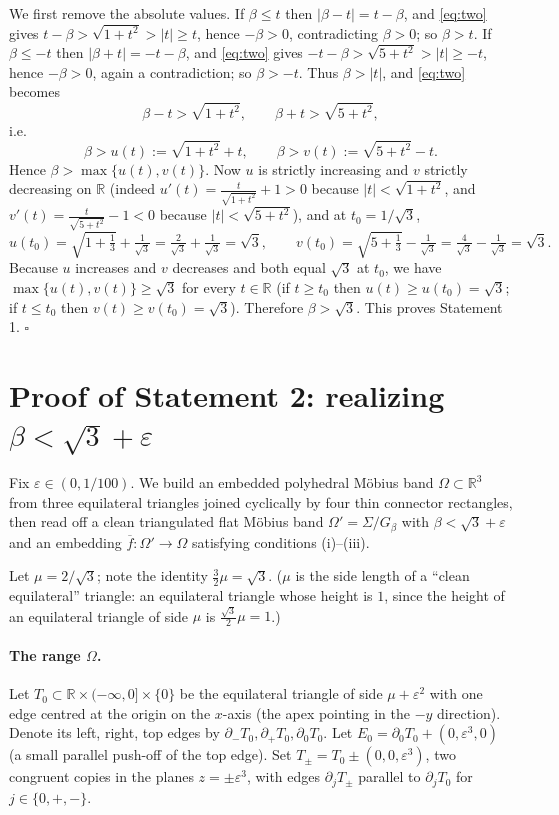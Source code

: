 \documentclass[12pt]{article}
\newcommand{\R}{\mathbb{R}}
\newcommand{\eps}{\varepsilon}
\newcommand{\Sig}{\Sigma}
\begin{document}
We first remove the absolute values. If $\beta\le t$ then
$|\beta-t|=t-\beta$, and \eqref{eq:two} gives
$t-\beta>\sqrt{1+t^2}>|t|\ge t$, hence $-\beta>0$, contradicting
$\beta>0$; so $\beta>t$. If $\beta\le -t$ then $|\beta+t|=-t-\beta$, and
\eqref{eq:two} gives $-t-\beta>\sqrt{5+t^2}>|t|\ge -t$, hence
$-\beta>0$, again a contradiction; so $\beta>-t$. Thus $\beta>|t|$, and
\eqref{eq:two} becomes
\[
\beta-t>\sqrt{1+t^2},\qquad \beta+t>\sqrt{5+t^2},
\]
i.e.
\[
\beta>u(t):=\sqrt{1+t^2}+t,\qquad \beta>v(t):=\sqrt{5+t^2}-t .
\]
Hence $\beta>\max\{u(t),v(t)\}$. Now $u$ is strictly increasing and $v$
strictly decreasing on $\R$ (indeed $u'(t)=\tfrac{t}{\sqrt{1+t^2}}+1>0$
because $|t|<\sqrt{1+t^2}$, and $v'(t)=\tfrac{t}{\sqrt{5+t^2}}-1<0$
because $|t|<\sqrt{5+t^2}$), and at $t_0=1/\sqrt3$,
\[
u(t_0)=\sqrt{1+\tfrac13}+\tfrac1{\sqrt3}=\tfrac{2}{\sqrt3}+\tfrac1{\sqrt3}
=\sqrt3,\qquad
v(t_0)=\sqrt{5+\tfrac13}-\tfrac1{\sqrt3}=\tfrac{4}{\sqrt3}-\tfrac1{\sqrt3}
=\sqrt3 .
\]
Because $u$ increases and $v$ decreases and both equal $\sqrt3$ at $t_0$,
we have $\max\{u(t),v(t)\}\ge\sqrt3$ for every $t\in\R$ (if $t\ge t_0$
then $u(t)\ge u(t_0)=\sqrt3$; if $t\le t_0$ then $v(t)\ge v(t_0)=\sqrt3$).
Therefore $\beta>\sqrt3$. This proves Statement 1. \hfill$\square$

\section{Proof of Statement 2: realizing $\beta<\sqrt3+\eps$}
\label{sec:S2}

Fix $\eps\in(0,1/100)$. We build an embedded polyhedral M\"obius band
$\Omega\subset\R^3$ from three equilateral triangles joined cyclically by
four thin connector rectangles, then read off a clean triangulated flat
M\"obius band $\Omega'=\Sig/G_\beta$ with $\beta<\sqrt3+\eps$ and an
embedding $\overline f:\Omega'\to\Omega$ satisfying conditions (i)--(iii).

Let $\mu=2/\sqrt3$; note the identity $\tfrac32\mu=\sqrt3$. ($\mu$ is the
side length of a ``clean equilateral'' triangle: an equilateral triangle
whose height is $1$, since the height of an equilateral triangle of side
$\mu$ is $\tfrac{\sqrt3}{2}\mu=1$.)

\paragraph{The range $\Omega$.}
Let $T_0\subset \R\times(-\infty,0]\times\{0\}$ be the equilateral
triangle of side $\mu+\eps^2$ with one edge centred at the origin on the
$x$-axis (the apex pointing in the $-y$ direction). Denote its left,
right, top edges by $\partial_-T_0,\partial_+T_0,\partial_0T_0$. Let
$E_0=\partial_0T_0+(0,\eps^3,0)$ (a small parallel push-off of the top
edge). Set $T_\pm=T_0\pm(0,0,\eps^3)$, two congruent copies in the planes
$z=\pm\eps^3$, with edges $\partial_jT_\pm$ parallel to $\partial_jT_0$
for $j\in\{0,+,-\}$.
\end{document}
